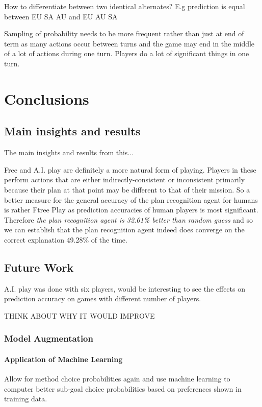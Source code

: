\documentclass[parskip]{cs4rep}
\begin{document}
How to differentiate between two identical alternates? E.g prediction is equal between EU SA AU and EU AU SA 

Sampling of probability needs to be more frequent rather than just at end of term as many actions occur between turns and the game may end in the middle of a lot of actions during one turn. Players do a lot of significant things in one turn.

\chapter{Conclusions}

\section{Main insights and results}

The main insights and results from this...

Free and A.I. play are definitely a more natural form of playing. Players in these perform actions that are either indirectly-consistent or inconsistent primarily because their plan at that point may be different to that of their mission. So a better measure for the general accuracy of the plan recognition  agent for humans is rather Ftree Play as prediction accuracies of human players is most significant. Therefore \textit{the plan recognition agent is 32.61\% better than random guess} and so we can establish that the plan recognition agent indeed does converge on the correct explanation 49.28\% of the time.

\section{Future Work}

A.I. play was done with six players, would be interesting to see the effects on prediction accuracy on games with different number of players.

THINK ABOUT WHY IT WOULD IMPROVE

\subsection{Model Augmentation}

\subsubsection{Application of Machine Learning}

Allow for method choice probabilities again and use machine learning to computer better sub-goal choice probabilities based on preferences shown in training data.
\end{document}
